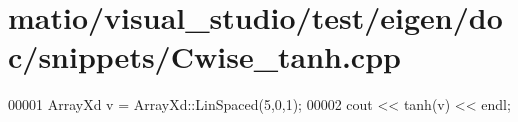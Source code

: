 \hypertarget{matio_2visual__studio_2test_2eigen_2doc_2snippets_2_cwise__tanh_8cpp_source}{}\section{matio/visual\+\_\+studio/test/eigen/doc/snippets/\+Cwise\+\_\+tanh.cpp}
\label{matio_2visual__studio_2test_2eigen_2doc_2snippets_2_cwise__tanh_8cpp_source}

\begin{DoxyCode}
00001 ArrayXd v = ArrayXd::LinSpaced(5,0,1);
00002 cout << tanh(v) << endl;
\end{DoxyCode}
